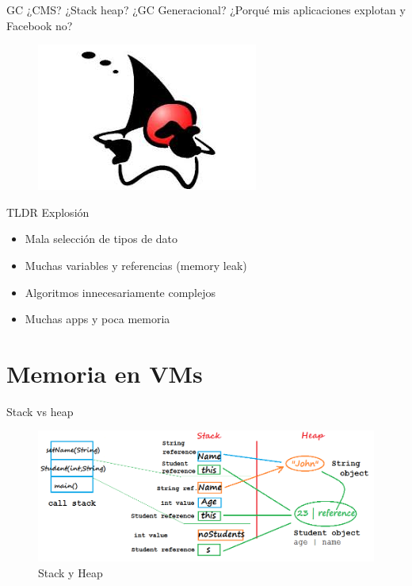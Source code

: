 \documentclass{beamer}
\begin{document}
\begin{frame}{GC}
\Large ¿CMS? ¿Stack heap? ¿GC Generacional? ¿Porqué mis aplicaciones explotan y Facebook no?
\begin{figure}
	\centering
	\includegraphics[width=0.6\linewidth]{Images/dukewhy}
\end{figure}
\end{frame}


\begin{frame}{TLDR}
Explosión
\begin{itemize}
	\item Mala selección de tipos de dato
	\item Muchas variables y referencias (memory leak)
	\item Algoritmos innecesariamente complejos
	\item Muchas apps y poca memoria
\end{itemize}

\end{frame}

\section{Memoria en VMs}
\begin{frame}{Stack vs heap}
\begin{figure}
	\centering
	\includegraphics[width=\linewidth]{Images/heap}
	\caption{Stack y Heap}
	\label{fig:heap}
\end{figure}

\end{frame}
\end{document}
